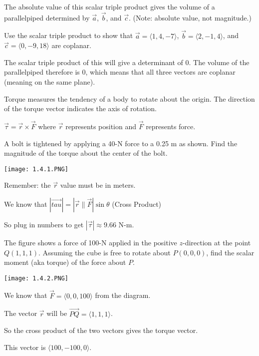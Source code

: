 \documentclass[../calc3.tex]{subfiles}
\begin{document}
The absolute value of this scalar triple product gives the volume of a parallelpiped determined by $\vec{a}$, $\vec{b}$, and $\vec{c}$. (Note: absolute value, not magnitude.)

\begin{example}
    Use the scalar triple product to show that $\vec{a}=\langle 1,4,-7\rangle$, $\vec{b}=\langle 2,-1,4\rangle$, and $\vec{c}=\langle 0,-9,18\rangle$ are coplanar.

    The scalar triple product of this will give a determinant of 0. The volume of the parallelpiped therefore is 0, which means that all three vectors are coplanar (meaning on the same plane).
\end{example}

Torque measures the tendency of a body to rotate about the origin. The direction of the torque vector indicates the axis of rotation.

$\vec{\tau}=\vec{r}\times \vec{F}$ where $\vec{r}$ represents position and $\vec{F}$ represents force.

\begin{example}
    A bolt is tightened by applying a 40-N force to a 0.25 m as shown. Find the magnitude of the torque about the center of the bolt.
    \begin{center}
        \texttt{[image: 1.4.1.PNG]}
    \end{center}

    Remember: the $\vec{r}$ value must be in meters.

    We know that $|\vec{tau}|=|\vec{r}\|\vec{F}|\sin\theta$ (Cross Product)

    So plug in numbers to get $|\vec{\tau}| \approx 9.66$ N-m.
\end{example}

\begin{example}
    The figure shows a force of 100-N applied in the positive $z$-direction at the point $Q(1,1,1)$. Assuming the cube is free to rotate about $P(0,0,0)$, find the scalar moment (aka torque) of the force about $P$.
    \begin{center}
        \texttt{[image: 1.4.2.PNG]}
    \end{center}

    We know that $\vec{F}=\langle 0,0,100\rangle$ from the diagram.

    The vector $\vec{r}$ will be $\overrightarrow{PQ} = \langle 1,1,1\rangle$.

    So the cross product of the two vectors gives the torque vector.

    This vector is $\langle 100,-100,0\rangle$.
\end{example}
\end{document}

